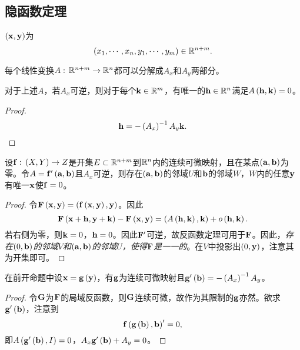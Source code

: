 \documentclass{ctexrep}
\begin{document}
  \subsection{隐函数定理}
  \begin{definition}
    $\left(\mathbf{x},\mathbf{y}\right)$为
    \[ \left(x_1,\cdots,x_n,y_1,\cdots,y_m\right) \in \mathbb{R}^{n+m}. \]
  \end{definition}
  每个线性变换$A:\, \mathbb{R}^{n+m} \rightarrow \mathbb{R}^n$都可以分解成$A_x$和$A_y$两部分。
  \begin{theorem}
    对于上述$A$，若$A_x$可逆，则对于每个$\mathbf{k}\in\mathbb{R}^m$，有唯一的$\mathbf{h}\in\mathbb{R}^n$满足$A\left(\mathbf{h},\mathbf{k}\right)=0$。
  \end{theorem}
  \begin{proof}
    \[ \mathbf{h} = -\left(A_x\right)^{-1}A_y\mathbf{k}. \qedhere \]
  \end{proof}
  \begin{theorem}
    设$\mathbf{f}:\, \left(X,Y\right) \rightarrow Z$是开集$E\subset\mathbb{R}^{n+m}$到$\mathbb{R}^n$内的连续可微映射，且在某点$\left(\mathbf{a},\mathbf{b}\right)$为零。令$A=\mathbf{f}'\left(\mathbf{a},\mathbf{b}\right)$且$A_x$可逆，则存在$\left(\mathbf{a},\mathbf{b}\right)$的邻域$U$和$\mathbf{b}$的邻域$W$，$W$内的任意$\mathbf{y}$有唯一$\mathbf{x}$使$\mathbf{f}=0$。
  \end{theorem}
  \begin{proof}
    令$\mathbf{F}\left(\mathbf{x}, \mathbf{y}\right)= \left(\mathbf{f}\left(\mathbf{x},\mathbf{y}\right),\mathbf{y}\right)$。因此
    \[ \mathbf{F}\left(\mathbf{x}+\mathbf{h}, \mathbf{y}+\mathbf{k}\right)-\mathbf{F}\left(\mathbf{x}, \mathbf{y}\right)=\left(A\left(\mathbf{h},\mathbf{k}\right),\mathbf{k}\right)+o\left(\mathbf{h},\mathbf{k}\right). \]
    若右侧为零，则$\mathbf{k}=0$，$\mathbf{h}=0$。因此$\mathbf{F}'$可逆，故反函数定理可用于$\mathbf{F}$。因此，\emph{存在$\left(0,\mathbf{b}\right)$的邻域$V$和$\left(\mathbf{a},\mathbf{b}\right)$的邻域$U$，使得$\mathbf{F}$是一一的}。在$V$中投影出$\left(0,\mathbf{y}\right)$，注意其为开集即可。
  \end{proof}
  \begin{theorem}
    在前开命题中设$\mathbf{x}=\mathbf{g}\left(\mathbf{y}\right)$，有$\mathbf{g}$为连续可微映射且$\mathbf{g}'\left(\mathbf{b}\right)=-\left(A_x\right)^{-1}A_y$。
  \end{theorem}
  \begin{proof}
    令$\mathbf{G}$为$\mathbf{F}$的局域反函数，则$\mathbf{G}$连续可微，故作为其限制的$\mathbf{g}$亦然。欲求$\mathbf{g}'\left(\mathbf{b}\right)$，注意到
    \[ \mathbf{f}\left(\mathbf{g}\left(\mathbf{b}\right),\mathbf{b}\right)'=0, \]
    即$A\left(\mathbf{g}'\left(\mathbf{b}\right),I\right)=0$，$A_x\mathbf{g}'\left(\mathbf{b}\right)+A_y=0$。
  \end{proof}
\end{document}
